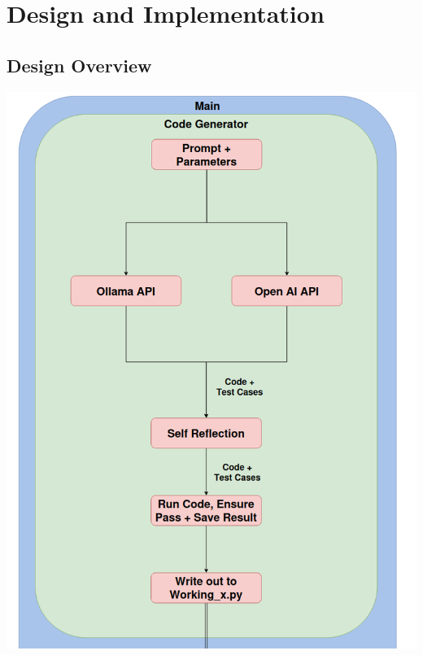 \documentclass[12pt]{extarticle}
\begin{document}
\newpage
\section{Design and Implementation}

\subsection{Design Overview}
\includegraphics[width=\linewidth]{Images/Tall_design_1.png}
\end{document}
